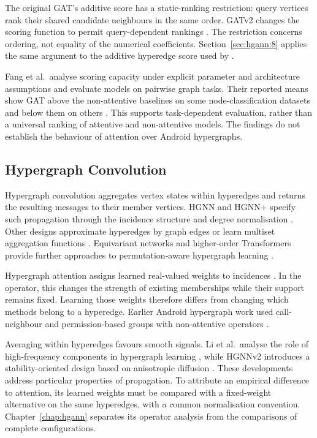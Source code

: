 The original GAT's additive score has a static-ranking restriction: query vertices rank
their shared candidate neighbours in the same order. GATv2 changes the scoring function to
permit query-dependent rankings \cite{brody2022gatv2}. The restriction concerns ordering,
not equality of the numerical coefficients. Section~\ref{sec:hgann:8} applies the same
argument to the additive hyperedge score used by \hgann{}.

Fang et al.\ analyse scoring capacity under explicit parameter and architecture assumptions
and evaluate models on pairwise graph tasks. Their reported means show GAT above the
non-attentive baselines on some node-classification datasets and below them on others
\cite[Table~2]{fang2025kaa}. This supports task-dependent evaluation, rather than a universal
ranking of attentive and non-attentive models. The findings do not establish the behaviour
of attention over Android hypergraphs.

\subsection{Hypergraph Convolution}
\label{sec:background:learning:hypergraphconvolution}

Hypergraph convolution aggregates vertex states within hyperedges and returns the resulting
messages to their member vertices. HGNN and HGNN+ specify such propagation through the
incidence structure and degree normalisation \cite{feng2019hypergraph,gao2023hgnn}.
Other designs approximate hyperedges by graph edges \cite{yadati2019hypergcn} or learn
multiset aggregation functions \cite{chien2022allset}. Equivariant networks and higher-order
Transformers provide further approaches to permutation-aware hypergraph learning
\cite{kim2022equivariant,kim2021transformers}.

Hypergraph attention assigns learned real-valued weights to incidences
\cite{bai2021hypergraphattention}. In the \hgann{} operator, this changes the strength of
existing memberships while their support remains fixed. Learning those weights therefore
differs from changing which methods belong to a hyperedge. Earlier Android hypergraph work
used call-neighbour and permission-based groups with non-attentive operators
\cite{zhang2023android}.

Averaging within hyperedges favours smooth signals. Li et al.\ analyse the role of
high-frequency components in hypergraph learning \cite{li2026highpass}, while HGNNv2
introduces a stability-oriented design based on anisotropic diffusion
\cite{gao2026hgnnv2}. These developments address particular properties of propagation.
To attribute an empirical difference to attention, its learned weights must be compared
with a fixed-weight alternative on the same hyperedges, with a common normalisation
convention. Chapter~\ref{chap:hgann} separates its operator analysis from the comparisons
of complete configurations.


